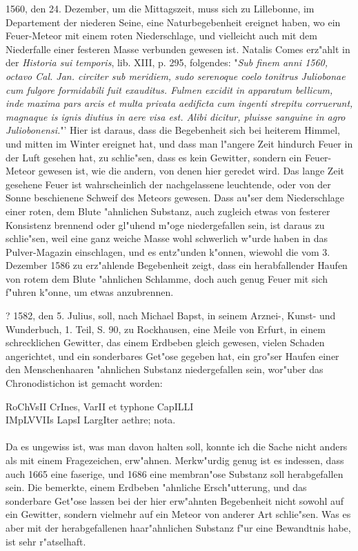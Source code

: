 \documentclass[a4paper, 11pt, oneside, polutonikogreek, german]{article}
\begin{document}
1560, den 24. Dezember, um die Mittagszeit, muss sich zu Lillebonne, im Departement der niederen Seine, eine Naturbegebenheit ereignet haben, wo ein Feuer-Meteor mit einem roten Niederschlage, und vielleicht auch mit dem Niederfalle einer festeren Masse verbunden gewesen ist. Natalis Comes erz"ahlt in der \emph{Historia sui temporis}, lib. XIII, p. 295, folgendes: "\emph{Sub finem anni 1560, octavo Cal. Jan. circiter sub meridiem, sudo serenoque coelo tonitrus Juliobonae cum fulgore formidabili fuit exauditus. Fulmen excidit in apparatum bellicum, inde maxima pars arcis et multa privata aedificta cum ingenti strepitu corruerunt, magnaque is ignis diutius in aere visa est. Alibi dicitur, pluisse sanguine in agro Juliobonensi.}"' Hier ist daraus, dass die Begebenheit sich bei heiterem Himmel, und mitten im Winter ereignet hat, und dass man l"angere Zeit hindurch Feuer in der Luft gesehen hat, zu schlie"sen, dass es kein Gewitter, sondern ein Feuer-Meteor gewesen ist, wie die andern, von denen hier geredet wird. Das lange Zeit gesehene Feuer ist wahrscheinlich der nachgelassene leuchtende, oder von der Sonne beschienene Schweif des Meteors gewesen. Dass au"ser dem Niederschlage einer roten, dem Blute "ahnlichen Substanz, auch zugleich etwas von festerer Konsistenz brennend oder gl"uhend m"oge niedergefallen sein, ist daraus zu schlie"sen, weil eine ganz weiche Masse wohl schwerlich w"urde haben in das Pulver-Magazin einschlagen, und es entz"unden k"onnen, wiewohl die vom 3. Dezember 1586 zu erz"ahlende Begebenheit zeigt, dass ein herabfallender Haufen von rotem dem Blute "ahnlichen Schlamme, doch auch genug Feuer mit sich f"uhren k"onne, um etwas anzubrennen.

? 1582, den 5. Julius, soll, nach Michael Bapst, in seinem Arznei-, Kunst- und Wunderbuch, 1. Teil, S. 90, zu Rockhausen, eine Meile von Erfurt, in einem schrecklichen Gewitter, das einem Erdbeben gleich gewesen, vielen Schaden angerichtet, und ein sonderbares Get"ose gegeben hat, ein gro"ser Haufen einer den Menschenhaaren "ahnlichen Substanz niedergefallen sein, wor"uber das Chronodistichon ist gemacht worden:
\begin{center}
RoChVsII CrInes, VarII et typhone CapILLI\\
IMpLVVIIs LapsI LargIter aethre; nota.
\end{center}
\paragraph{}
Da es ungewiss ist, was man davon halten soll, konnte ich die Sache nicht anders als mit einem Fragezeichen, erw"ahnen. Merkw"urdig genug ist es indessen, dass auch 1665 eine faserige, und 1686 eine membran"ose Substanz soll herabgefallen sein. Die bemerkte, einem Erdbeben "ahnliche Ersch"utterung, und das sonderbare Get"ose lassen bei der hier erw"ahnten Begebenheit nicht sowohl auf ein Gewitter, sondern vielmehr auf ein Meteor von anderer Art schlie"sen. Was es aber mit der herabgefallenen haar"ahnlichen Substanz f"ur eine Bewandtnis habe, ist sehr r"atselhaft.
\end{document}
